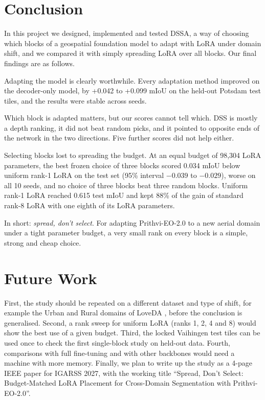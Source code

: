 \documentclass[11pt,a4paper]{report}
\begin{document}
\section{Conclusion}

In this project we designed, implemented and tested DSSA, a way of choosing which blocks of a geospatial foundation model to adapt with LoRA under domain shift, and we compared it with simply spreading LoRA over all blocks. Our final findings are as follows.

Adapting the model is clearly worthwhile. Every adaptation method improved on the decoder-only model, by +0.042 to +0.099 mIoU on the held-out Potsdam test tiles, and the results were stable across seeds.

Which block is adapted matters, but our scores cannot tell which. DSS is mostly a depth ranking, it did not beat random picks, and it pointed to opposite ends of the network in the two directions. Five further scores did not help either.

Selecting blocks lost to spreading the budget. At an equal budget of 98,304 LoRA parameters, the best frozen choice of three blocks scored 0.034 mIoU below uniform rank-1 LoRA on the test set (95\% interval $-0.039$ to $-0.029$), worse on all 10 seeds, and no choice of three blocks beat three random blocks. Uniform rank-1 LoRA reached 0.615 test mIoU and kept 88\% of the gain of standard rank-8 LoRA with one eighth of its LoRA parameters.

In short: \textit{spread, don't select}. For adapting Prithvi-EO-2.0 to a new aerial domain under a tight parameter budget, a very small rank on every block is a simple, strong and cheap choice.

\section{Future Work}

First, the study should be repeated on a different dataset and type of shift, for example the Urban and Rural domains of LoveDA \cite{wang2021loveda}, before the conclusion is generalised. Second, a rank sweep for uniform LoRA (ranks 1, 2, 4 and 8) would show the best use of a given budget. Third, the locked Vaihingen test tiles can be used once to check the first single-block study on held-out data. Fourth, comparisons with full fine-tuning and with other backbones would need a machine with more memory. Finally, we plan to write up the study as a 4-page IEEE paper for IGARSS 2027, with the working title ``Spread, Don't Select: Budget-Matched LoRA Placement for Cross-Domain Segmentation with Prithvi-EO-2.0''.
\end{document}

